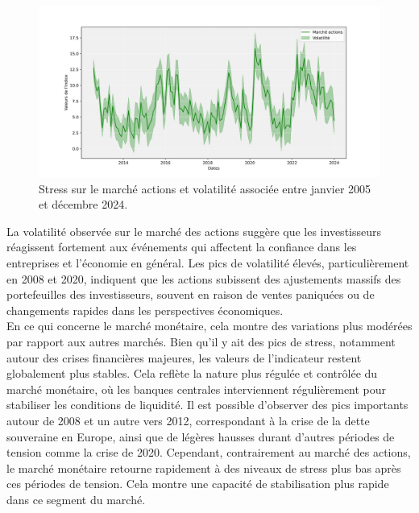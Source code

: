 \begin{sloppypar}
\begin{figure}[H]
    \centering
    \includegraphics[width=1\linewidth]{figures/sous_indicateurs_equity_stress_equity.png}
    \caption{Stress sur le marché actions et volatilité associée entre janvier 2005 et décembre 2024.}
    \label{fig:enter-label}
\end{figure}

La volatilité observée sur le marché des actions suggère que les investisseurs réagissent fortement aux événements qui affectent la confiance dans les entreprises et l’économie en général. Les pics de volatilité élevés, particulièrement en 2008 et 2020, indiquent que les actions subissent des ajustements massifs des portefeuilles des investisseurs, souvent en raison de ventes paniquées ou de changements rapides dans les perspectives économiques.\\

En ce qui concerne le marché monétaire, cela montre des variations plus modérées par rapport aux autres marchés. Bien qu’il y ait des pics de stress, notamment autour des crises financières majeures, les valeurs de l'indicateur restent globalement plus stables. Cela reflète la nature plus régulée et contrôlée du marché monétaire, où les banques centrales interviennent régulièrement pour stabiliser les conditions de liquidité. Il est possible d'observer des pics importants autour de 2008 et un autre vers 2012, correspondant à la crise de la dette souveraine en Europe, ainsi que de légères hausses durant d'autres périodes de tension comme la crise de 2020. Cependant, contrairement au marché des actions, le marché monétaire retourne rapidement à des niveaux de stress plus bas après ces périodes de tension. Cela montre une capacité de stabilisation plus rapide dans ce segment du marché.


\end{sloppypar}
